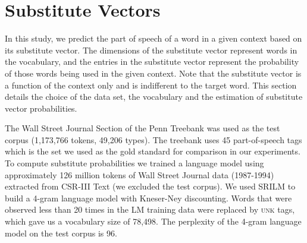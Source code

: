 \documentclass[11pt]{article}
\begin{document}
\section{Substitute Vectors}
\label{sec:lm}

In this study, we predict the part of speech of a word in a given
context based on its substitute vector.  The dimensions of the
substitute vector represent words in the vocabulary, and the entries
in the substitute vector represent the probability of those words
being used in the given context.  Note that the substitute vector is a
function of the context only and is indifferent to the target word.
This section details the choice of the data set, the vocabulary and
the estimation of substitute vector probabilities.

The Wall Street Journal Section of the Penn Treebank \cite{treebank3}
was used as the test corpus (1,173,766 tokens, 49,206 types).
The treebank uses 45 part-of-speech tags which is the set we used as
the gold standard for comparison in our experiments.
To compute substitute probabilities we trained a language model using
approximately 126 million tokens of Wall Street Journal data
(1987-1994) extracted from CSR-III Text \cite{csr3text} (we excluded
the test corpus).
We used SRILM \cite{Stolcke2002} to build a 4-gram language model with
Kneser-Ney discounting.
Words that were observed less than 20 times in the LM training data
were replaced by \textsc{unk} tags, which gave us a vocabulary size of
78,498.
The perplexity of the 4-gram language model on the test corpus is 96.
\end{document}
